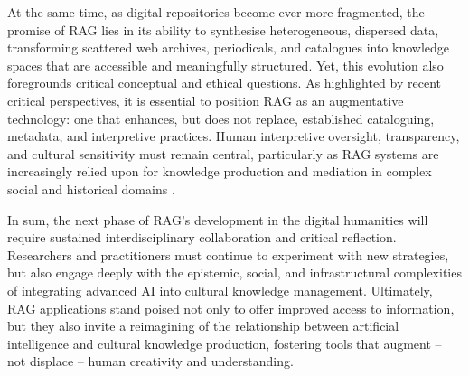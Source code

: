 \begin{spacing}{1.5}
At the same time, as digital repositories become ever more fragmented, the promise of RAG lies in its ability to synthesise heterogeneous, dispersed data, transforming scattered web archives, periodicals, and catalogues into knowledge spaces that are accessible and meaningfully structured. Yet, this evolution also foregrounds critical conceptual and ethical questions. As highlighted by recent critical perspectives, it is essential to position RAG as an augmentative technology: one that enhances, but does not replace, established cataloguing, metadata, and interpretive practices. Human interpretive oversight, transparency, and cultural sensitivity must remain central, particularly as RAG systems are increasingly relied upon for knowledge production and mediation in complex social and historical domains \citep{di_marcantonio_intelligenza_2024}.

In sum, the next phase of RAG’s development in the digital humanities will require sustained interdisciplinary collaboration and critical reflection. Researchers and practitioners must continue to experiment with new strategies, but also engage deeply with the epistemic, social, and infrastructural complexities of integrating advanced AI into cultural knowledge management. Ultimately, RAG applications stand poised not only to offer improved access to information, but they also invite a reimagining of the relationship between artificial intelligence and cultural knowledge production, fostering tools that augment -- not displace -- human creativity and understanding.
\end{spacing}